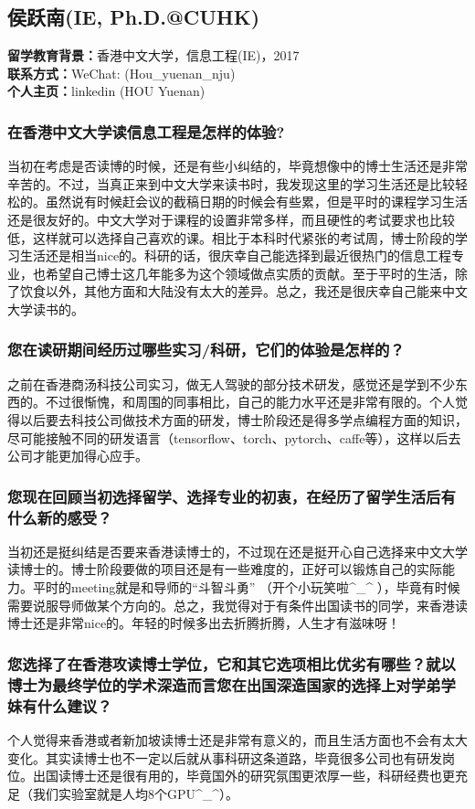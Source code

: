 \documentclass[a4paper,UTF8]{book}
\begin{document}
\clearpage
\subsection{侯跃南(IE, Ph.D.@CUHK)}
    \textbf{留学教育背景：}香港中文大学，信息工程(IE)，2017\\
    \textbf{联系方式：}WeChat: (Hou\_yuenan\_nju)\\
    \textbf{个人主页：}linkedin (HOU Yuenan)

    \subsubsection*{在香港中文大学读信息工程是怎样的体验?}
    当初在考虑是否读博的时候，还是有些小纠结的，毕竟想像中的博士生活还是非常辛苦的。不过，当真正来到中文大学来读书时，我发现这里的学习生活还是比较轻松的。虽然说有时候赶会议的截稿日期的时候会有些累，但是平时的课程学习生活还是很友好的。中文大学对于课程的设置非常多样，而且硬性的考试要求也比较低，这样就可以选择自己喜欢的课。相比于本科时代紧张的考试周，博士阶段的学习生活还是相当nice的。科研的话，很庆幸自己能选择到最近很热门的信息工程专业，也希望自己博士这几年能多为这个领域做点实质的贡献。至于平时的生活，除了饮食以外，其他方面和大陆没有太大的差异。总之，我还是很庆幸自己能来中文大学读书的。

    \subsubsection*{您在读研期间经历过哪些实习/科研，它们的体验是怎样的？}
    之前在香港商汤科技公司实习，做无人驾驶的部分技术研发，感觉还是学到不少东西的。不过很惭愧，和周围的同事相比，自己的能力水平还是非常有限的。个人觉得以后要去科技公司做技术方面的研发，博士阶段还是得多学点编程方面的知识，尽可能接触不同的研发语言（tensorflow、torch、pytorch、caffe等），这样以后去公司才能更加得心应手。

    \subsubsection*{您现在回顾当初选择留学、选择专业的初衷，在经历了留学生活后有什么新的感受？}
    当初还是挺纠结是否要来香港读博士的，不过现在还是挺开心自己选择来中文大学读博士的。博士阶段要做的项目还是有一些难度的，正好可以锻炼自己的实际能力。平时的meeting就是和导师的“斗智斗勇” （开个小玩笑啦\^{}\_\^{} ），毕竟有时候需要说服导师做某个方向的。总之，我觉得对于有条件出国读书的同学，来香港读博士还是非常nice的。年轻的时候多出去折腾折腾，人生才有滋味呀！

    \subsubsection*{您选择了在香港攻读博士学位，它和其它选项相比优劣有哪些？就以博士为最终学位的学术深造而言您在出国深造国家的选择上对学弟学妹有什么建议？}
    个人觉得来香港或者新加坡读博士还是非常有意义的，而且生活方面也不会有太大变化。其实读博士也不一定以后就从事科研这条道路，毕竟很多公司也有研发岗位。出国读博士还是很有用的，毕竟国外的研究氛围更浓厚一些，科研经费也更充足（我们实验室就是人均8个GPU\^{}\_\^{}）。
\end{document}
